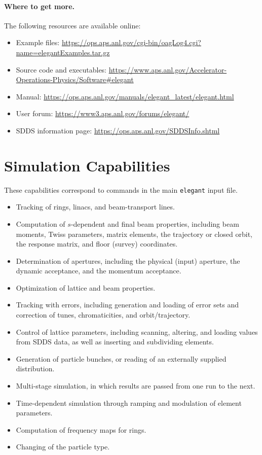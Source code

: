 \documentclass[11pt]{article}
\newcommand{\elegant}{\texttt{elegant}}
\newcommand{\sdds}{SDDS}
\begin{document}
\paragraph{Where to get more.} The following resources are available online:
\begin{itemize}[nosep]
  \item Example files:
        \url{https://ops.aps.anl.gov/cgi-bin/oagLog4.cgi?name=elegantExamples.tar.gz}
  \item Source code and executables:
        \url{https://www.aps.anl.gov/Accelerator-Operations-Physics/Software\#elegant}
  \item Manual:
        \url{https://ops.aps.anl.gov/manuals/elegant_latest/elegant.html}
  \item User forum:
        \url{https://www3.aps.anl.gov/forums/elegant/}
  \item \sdds{} information page:
        \url{https://ops.aps.anl.gov/SDDSInfo.shtml}
\end{itemize}

\section{Simulation Capabilities}

These capabilities correspond to commands in the main \elegant{} input file.

\begin{itemize}
  \item Tracking of rings, linacs, and beam-transport lines.
  \item Computation of $s$-dependent and final beam properties, including beam
        moments, Twiss parameters, matrix elements, the trajectory or closed
        orbit, the response matrix, and floor (survey) coordinates.
  \item Determination of apertures, including the physical (input) aperture,
        the dynamic acceptance, and the momentum acceptance.
  \item Optimization of lattice and beam properties.
  \item Tracking with errors, including generation and loading of error sets
        and correction of tunes, chromaticities, and orbit/trajectory.
  \item Control of lattice parameters, including scanning, altering, and
        loading values from \sdds{} data, as well as inserting and subdividing
        elements.
  \item Generation of particle bunches, or reading of an externally supplied
        distribution.
  \item Multi-stage simulation, in which results are passed from one run to the
        next.
  \item Time-dependent simulation through ramping and modulation of element
        parameters.
  \item Computation of frequency maps for rings.
  \item Changing of the particle type.
\end{itemize}
\end{document}
